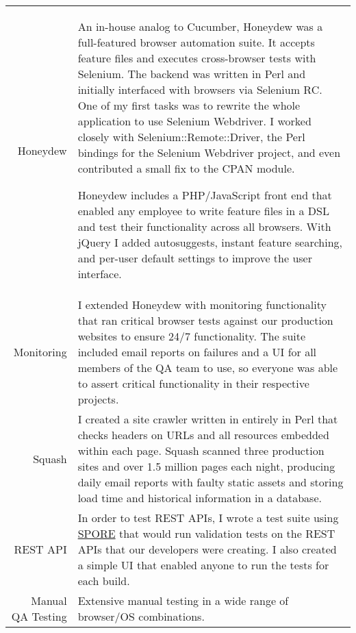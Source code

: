 \begin{position}
  \begin{tabularx}{\linewidth}{r|X}
    Honeydew & An in-house analog to Cucumber, Honeydew was a full-featured browser
    automation suite. It accepts feature files and executes
    cross-browser tests with Selenium. The backend was written in Perl
    and initially interfaced with browsers via Selenium RC. One of my
    first tasks was to rewrite the whole application to use Selenium
    Webdriver. I worked closely with Selenium::Remote::Driver, the Perl
    bindings for the Selenium Webdriver project, and even contributed a
    small fix to the CPAN module.

    Honeydew includes a PHP/JavaScript front end that enabled any
    employee to write feature files in a DSL and test their
    functionality across all browsers. With jQuery I added autosuggests,
    instant feature searching, and per-user default settings to improve
    the user interface.\\

    Monitoring & I extended Honeydew with monitoring functionality that ran critical
    browser tests against our production websites to ensure 24/7
    functionality. The suite included email reports on failures and a UI
    for all members of the QA team to use, so everyone was able to
    assert critical functionality in their respective projects.\\

    Squash & I created a site crawler written in entirely in Perl that checks
    headers on URLs and all resources embedded within each page. Squash
    scanned three production sites and over 1.5 million pages each
    night, producing daily email reports with faulty static assets and
    storing load time and historical information in a database. \\

    REST API & In order to test REST APIs, I wrote a test suite using
    \href{https://github.com/SPORE}{SPORE} that would run validation
    tests on the REST APIs that our developers were creating. I also
    created a simple UI that enabled anyone to run the tests for each
    build. \\
    Manual QA Testing & Extensive manual testing in a wide range of browser/OS combinations. \\
  \end{tabularx}
\end{position}
